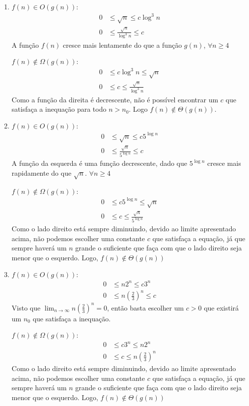 \documentclass{article}
\begin{document}
\begin{enumerate}
\begin{enumerate}
		\item $f(n) \in O(g(n))$:
		\begin{align*}
			0 &\le \sqrt{n} \le c {\log^3 n} \\
			0 &\le \frac{\sqrt{n}}{{\log^3 n}} \le c
		\end{align*}
		A função $f(n)$ cresce mais lentamente do que a função $g(n)$, $\forall
		n \geq 4$

		$f(n) \notin \Omega(g(n))$:
		\begin{align*}
			0 &\le c {\log^3 n} \le \sqrt{n} \\
			0 &\le c \le \frac{\sqrt{n}}{\log^3 n}
		\end{align*}
		Como a função da direita é decrescente, não é possível encontrar um $c$
		que satisfaça a inequação para todo $n > n_0$. Logo $f(n) \notin
		\Theta(g(n))$.

		\item $f(n) \in O(g(n))$:
		\begin{align*}
			0 &\le \sqrt{n} \le c {5^{\log n}} \\
			0 &\le \frac{\sqrt{n}}{5^{\log n}} \le c
		\end{align*}
		A função da esquerda é uma função decrescente, dado que $5^{\log n}$
		cresce mais rapidamente do que $\sqrt{n}$.  $\forall n \geq 4$

		$f(n) \notin \Omega(g(n))$:
		\begin{align*}
			0 &\le c {5^{\log n}} \le \sqrt{n}\\
			0 &\le c \le \frac{\sqrt{n}}{5^{\log n}}
		\end{align*}
		Como o lado direito está sempre diminuindo, devido ao limite
		apresentado acima, não podemos escolher uma constante $c$ que satisfaça
		a equação, já que sempre haverá um $n$ grande o suficiente que faça com
		que o lado direito seja menor que o esquerdo. Logo, $f(n) \notin
		\Theta(g(n))$

		\item $f(n) \in O(g(n))$:
		\begin{align*}
			0 &\le n2^n \le c 3^n \\
			0 &\le n\left(\frac{2}{3}\right)^n \le c
		\end{align*}
		Visto que $\lim_{n\to\infty}n\left(\frac{2}{3}\right)^n = 0$, então
		basta escolher um $c > 0$ que existirá um $n_0$ que satisfaça a
		inequação.

		$f(n) \notin \Omega(g(n))$:
		\begin{align*}
			0 &\le c 3^n \le n 2^n \\
			0 &\le c \le n \left(\frac{2}{3}\right)^n
		\end{align*}
		Como o lado direito está sempre diminuindo, devido ao limite
		apresentado acima, não podemos escolher uma constante $c$ que satisfaça
		a equação, já que sempre haverá um $n$ grande o suficiente que faça com
		que o lado direito seja menor que o esquerdo. Logo, $f(n) \notin
		\Theta(g(n))$


\end{enumerate}
\end{enumerate}
\end{document}
